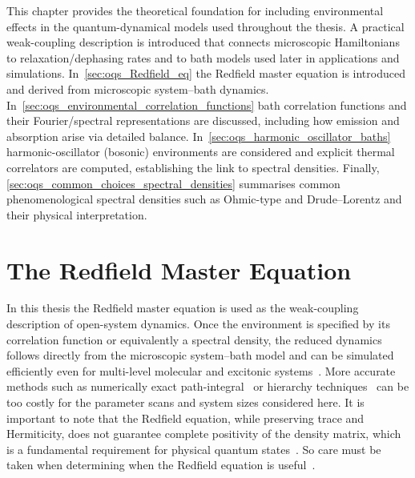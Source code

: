 This chapter provides the theoretical foundation for including environmental effects in the quantum-dynamical models used throughout the thesis. A practical weak-coupling description is introduced that connects microscopic Hamiltonians to relaxation/dephasing rates and to bath models used later in applications and simulations.
In~\autoref{sec:oqs_Redfield_eq} the Redfield master equation is introduced and derived from microscopic system--bath dynamics. In~\autoref{sec:oqs_environmental_correlation_functions} bath correlation functions and their Fourier/spectral representations are discussed, including how emission and absorption arise via detailed balance. In~\autoref{sec:oqs_harmonic_oscillator_baths} harmonic-oscillator (bosonic) environments are considered and explicit thermal correlators are computed, establishing the link to spectral densities. Finally, \autoref{sec:oqs_common_choices_spectral_densities} summarises common phenomenological spectral densities such as Ohmic-type and Drude--Lorentz and their physical interpretation.


\section{The Redfield Master Equation}
\label{sec:oqs_Redfield_eq}

In this thesis the Redfield master equation is used as the weak-coupling description of open-system dynamics. Once the environment is specified by its correlation function or equivalently a spectral density, the reduced dynamics follows directly from the microscopic system--bath model and can be simulated efficiently even for multi-level molecular and excitonic systems~\cite{breuerpetruccione2007theoryopenquantum, weiss2012quantumdissipativesystems, mukamel1995principlesnonlinearoptical}. More accurate methods such as numerically exact path-integral~\cite{feynmanvernon1963theorygeneralquantum} or hierarchy techniques~\cite{tanimura2020numericallyexactapproach} can be too costly for the parameter scans and system sizes considered here. It is important to note that the Redfield equation, while preserving trace and Hermiticity, does not guarantee complete positivity of the density matrix, which is a fundamental requirement for physical quantum states~\cite{rivasetal2010markovianmasterequations}. So care must be taken when determining when the Redfield equation is useful~\cite{redfield1965theoryrelaxationprocesses, rivasetal2014quantumnonmarkovianitycharacterization, lietal2018conceptsquantumnonmarkovianity}.

